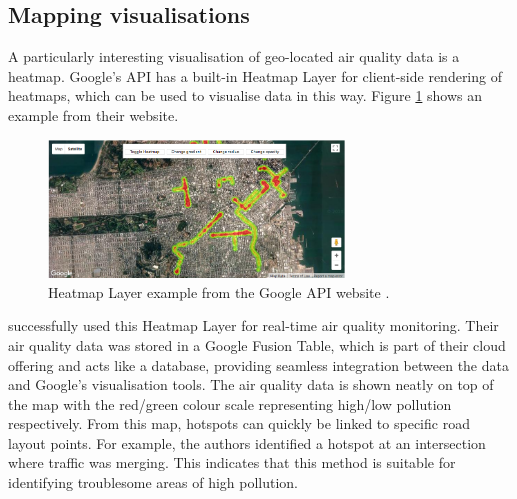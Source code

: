 \documentclass[11pt,twosided,a4paper]{report}
\begin{document}


\subsection{Mapping visualisations}

A particularly interesting visualisation of geo-located air quality data is a heatmap. Google's API has a built-in Heatmap Layer for client-side rendering of heatmaps, which can be used to visualise data in this way. Figure \ref{heatmap} shows an example from their website. 


\begin{figure}[!tb]
\centering
\includegraphics[width=0.7\textwidth]{googleapi_heatmap_layer}
\caption{Heatmap Layer example from the Google API website \citep{google2018heatmap}.}
\label{heatmap}
\end{figure}

\cite{Devarakonda2013} successfully used this Heatmap Layer for real-time air quality monitoring. Their air quality data was stored in a Google Fusion Table, which is part of their cloud offering and acts like a database, providing seamless integration between the data and Google's visualisation tools. The air quality data is shown neatly on top of the map with the red/green colour scale representing high/low pollution respectively. From this map, hotspots can quickly be linked to specific road layout points. For example, the authors identified a hotspot at an intersection where traffic was merging. This indicates that this method is suitable for identifying troublesome areas of high pollution.
\end{document}
